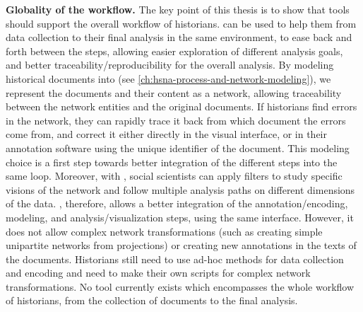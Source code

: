 \noindent\textbf{Globality of the \hsna workflow.} The key point of this thesis is to show that \va tools should support the overall \hsna workflow of historians.
\va can be used to help them from data collection to their final analysis in the same environment, to ease back and forth between the steps, allowing easier exploration of different analysis goals, and better traceability/reproducibility for the overall analysis.
By modeling historical documents into \modelplural (see \autoref{ch:hsna-process-and-network-modeling}), we represent the documents and their content as a network, allowing traceability between the network entities and the original documents.
If historians find errors in the network, they can rapidly trace it back from which document the errors come from, and correct it either directly in the visual interface, or in their annotation software using the unique identifier of the document.
This modeling choice is a first step towards better integration of the different steps into the same \va loop.
Moreover, with \combinet, social scientists can apply filters to study specific visions of the network and follow multiple analysis paths on different dimensions of the data.
\name, therefore, allows a better integration of the annotation/encoding, modeling, and analysis/visualization steps, using the same interface.
However, it does not allow complex network transformations (such as creating simple unipartite networks from projections) or creating new annotations in the texts of the documents.
Historians still need to use ad-hoc methods for data collection and encoding and need to make their own scripts for complex network transformations.
No tool currently exists which encompasses the whole workflow of historians, from the collection of documents to the final analysis.







